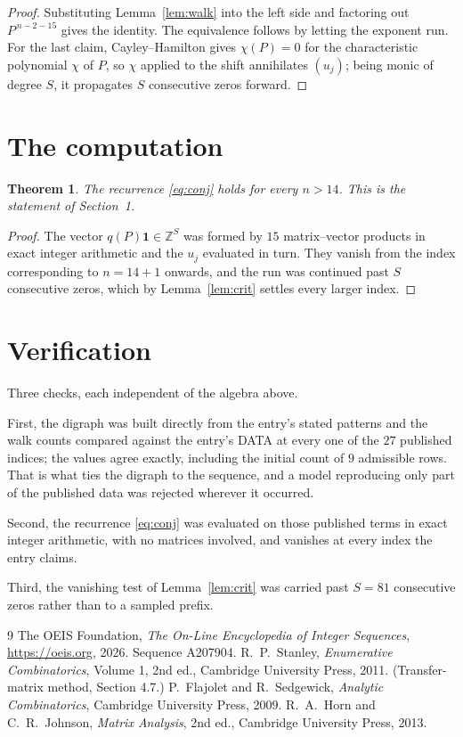 \documentclass[11pt,a4paper]{article}
\theoremstyle{plain}
\newtheorem{theorem}{Theorem}
\theoremstyle{definition}
\begin{document}
\begin{proof}
Substituting Lemma~\ref{lem:walk} into the left side and factoring out
$P^{\,n-2-15}$ gives the identity. The equivalence follows by letting the exponent
run. For the last claim, Cayley--Hamilton gives $\chi(P)=0$ for the characteristic
polynomial $\chi$ of $P$, so $\chi$ applied to the shift annihilates $(u_j)$; being monic of
degree $S$, it propagates $S$ consecutive zeros forward.
\end{proof}

\section{The computation}

\begin{theorem}
The recurrence \eqref{eq:conj} holds for every $n>14$. This is the statement of
Section~1.
\end{theorem}

\begin{proof}
The vector $q(P)\mathbf{1}\in\mathbb{Z}^{S}$ was formed by $15$ matrix--vector
products in exact integer arithmetic and the $u_j$ evaluated in turn. They vanish from the
index corresponding to $n=14+1$ onwards, and the run was continued past $S$ consecutive
zeros, which by Lemma~\ref{lem:crit} settles every larger index.
\end{proof}

\section{Verification}

Three checks, each independent of the algebra above.

First, the digraph was built directly from the entry's stated patterns and the walk counts
compared against the entry's DATA at every one of the $27$ published indices; the
values agree exactly, including the initial count of $9$ admissible rows. That is
what ties the digraph to the sequence, and a model reproducing only part of the published
data was rejected wherever it occurred.

Second, the recurrence \eqref{eq:conj} was evaluated on those published terms in exact
integer arithmetic, with no matrices involved, and vanishes at every index the entry claims.

Third, the vanishing test of Lemma~\ref{lem:crit} was carried past $S=81$ consecutive
zeros rather than to a sampled prefix.

\begin{thebibliography}{9}
 The OEIS Foundation, \emph{The On-Line Encyclopedia of Integer
Sequences}, \url{https://oeis.org}, 2026. Sequence A207904.
 R.~P.~Stanley, \emph{Enumerative Combinatorics}, Volume 1, 2nd ed.,
Cambridge University Press, 2011. (Transfer-matrix method, Section 4.7.)
 P.~Flajolet and R.~Sedgewick, \emph{Analytic Combinatorics}, Cambridge
University Press, 2009.
 R.~A.~Horn and C.~R.~Johnson, \emph{Matrix Analysis}, 2nd ed., Cambridge
University Press, 2013.
\end{thebibliography}
\end{document}
